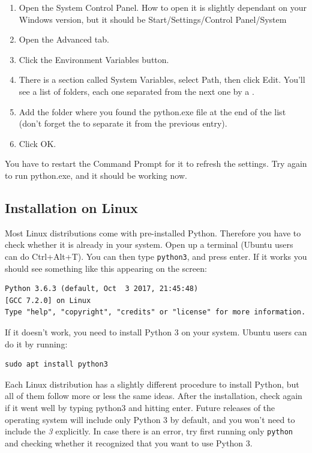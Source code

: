 \begin{enumerate}
 \item Open the System Control Panel. How to open it is slightly dependant on your Windows version, but it should be Start/Settings/Control Panel/System
 \item Open the Advanced tab.
 \item Click the Environment Variables button.
 \item There is a section called System Variables, select Path, then click Edit. You'll see a list of folders, each one separated from the next one by a \py{;}.
 \item Add the folder where you found the python.exe file at the end of the list (don't forget the \py{;} to separate it from the previous entry).
 \item Click OK\@.
\end{enumerate}

You have to restart the Command Prompt for it to refresh the settings. Try again to run python.exe, and it should be working now.

\subsection{Installation on Linux}\label{subsec:installation-on-linux}
Most Linux distributions come with pre-installed Python. Therefore you have to check whether it is already in your system. Open up a terminal (Ubuntu users can do Ctrl+Alt+T). You can then type \texttt{python3}, and press enter. If it works you should see something like this appearing on the screen:

\begin{verbatim}
Python 3.6.3 (default, Oct  3 2017, 21:45:48)
[GCC 7.2.0] on Linux
Type "help", "copyright", "credits" or "license" for more information.
\end{verbatim}

If it doesn't work, you need to install Python 3 on your system. Ubuntu users can do it by running:
\begin{verbatim}
sudo apt install python3
\end{verbatim}

Each Linux distribution has a slightly different procedure to install Python, but all of them follow more or less the same ideas. After the installation, check again if it went well by typing python3 and hitting enter. Future releases of the operating system will include only Python 3 by default, and you won't need to include the \emph{3} explicitly. In case there is an error, try first running only \texttt{python} and checking whether it recognized that you want to use Python 3.

